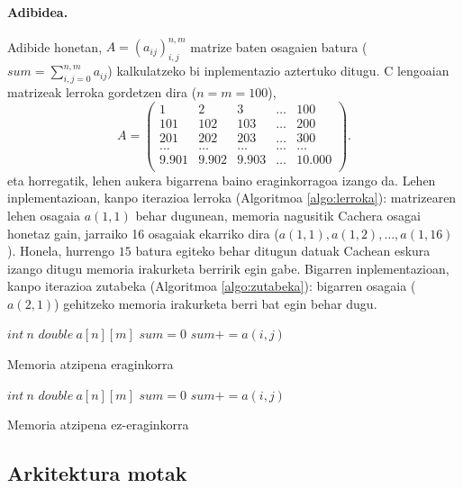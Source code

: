 \paragraph*{Adibidea.} Adibide honetan, $A=(a_{ij})_{i,j}^{n,m}$ matrize baten osagaien batura ($sum=\sum_{i,j=0}^{n,m} a_{ij}$) kalkulatzeko bi inplementazio aztertuko ditugu. C lengoaian matrizeak lerroka gordetzen dira ($n=m=100$),
\begin{equation*}
A=\left(\begin{array}{ccccc}
  1    & 2    & 3    & \dots & 100 \\
  101 & 102 & 103 &\dots & 200 \\
  201 & 202 & 203 &\dots & 300 \\
  \dots & \dots & \dots & \dots & \dots \\
  9.901 & 9.902 & 9.903 &\dots & 10.000 \\
  \end{array}\right).  
\end{equation*}
eta horregatik, lehen aukera bigarrena baino eraginkorragoa izango da. Lehen inplementazioan, kanpo iterazioa lerroka (Algoritmoa \ref{algo:lerroka}):  matrizearen lehen osagaia $a(1,1)$ behar dugunean, memoria nagusitik Cachera osagai honetaz gain, jarraiko 16 osagaiak ekarriko dira ($a(1,1),a(1,2),\dots,a(1,16)$). Honela, hurrengo $15$ batura egiteko behar ditugun datuak Cachean eskura izango ditugu memoria irakurketa berririk egin gabe. Bigarren inplementazioan, kanpo iterazioa zutabeka (Algoritmoa \ref{algo:zutabeka}): bigarren osagaia ($a(2,1)$) gehitzeko memoria irakurketa berri bat egin behar dugu. 

\begin{algorithm}[h]
 \BlankLine
  $int \ n$\;
  $double \ a[n][m]$\;
  \BlankLine
  $sum=0$\;
  {
   \BlankLine
   {
    \BlankLine 
    $sum+=a(i,j)$\;
   }
 }
 \caption{Memoria atzipena eraginkorra}
 \label{algo:lerroka}
\end{algorithm} 
\begin{algorithm}[h]
 \BlankLine
  $int \ n$\;
  $double \ a[n][m]$\;
  \BlankLine
  $sum=0$\;
  {
   \BlankLine
   {
    \BlankLine 
    $sum+=a(i,j)$\;
   }
 }
 \caption{Memoria atzipena ez-eraginkorra}
 \label{algo:zutabeka}
\end{algorithm} 


\subsection*{Arkitektura motak}

